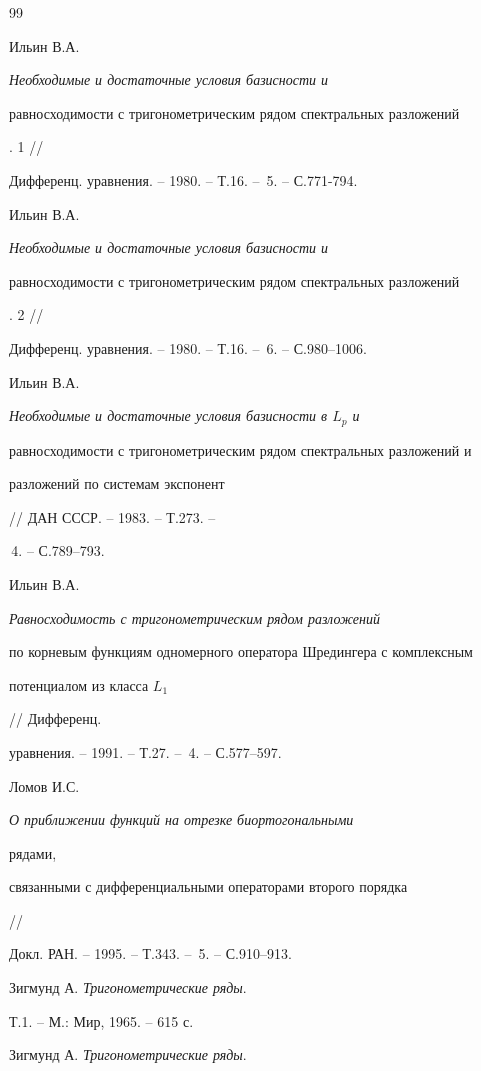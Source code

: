 {\begin{thebibliography}{99}







Ильин В.А. {\em Необходимые и достаточные условия базисности и


равносходимости с тригонометрическим рядом спектральных разложений}. 1 //


Дифференц. уравнения. -- 1980. -- Т.16. -- \No\,5. -- С.771-794.




Ильин В.А. {\em Необходимые и достаточные условия базисности и


равносходимости с тригонометрическим рядом спектральных разложений}. 2 //


Дифференц. уравнения. -- 1980. -- Т.16. -- \No\,6. -- С.980--1006.




Ильин В.А. {\em Необходимые и достаточные условия базисности в $L_p$ и


равносходимости с тригонометрическим рядом спектральных разложений и


разложений по системам экспонент} // ДАН СССР. -- 1983. -- Т.273. --


\No\,4. -- С.789--793.




Ильин В.А. {\em Равносходимость с тригонометрическим рядом разложений


по корневым функциям одномерного оператора Шредингера с комплексным


потенциалом из класса $L_1$} // Дифференц.


уравнения. -- 1991. -- Т.27. -- \No\,4. -- С.577--597.




Ломов И.С. {\em О приближении функций на отрезке биортогональными


рядами,


связанными с дифференциальными операторами второго порядка} //


Докл. РАН. -- 1995. -- Т.343. -- \No\,5. -- С.910--913.




Зигмунд А. {\em Тригонометрические ряды}.


Т.1. -- М.: Мир, 1965. -- 615 с.




Зигмунд А. {\em Тригонометрические ряды}.



\end{thebibliography}}
